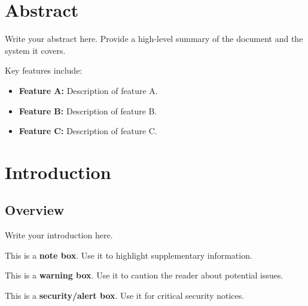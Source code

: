 \documentclass[11pt,a4paper]{article}
\begin{document}
\newpage
\tableofcontents
\newpage

\section*{Abstract}

Write your abstract here. Provide a high-level summary of the document and the system it covers.

Key features include:
\begin{itemize}[noitemsep]
    \item \textbf{Feature A:} Description of feature A.
    \item \textbf{Feature B:} Description of feature B.
    \item \textbf{Feature C:} Description of feature C.
\end{itemize}

\newpage

\section{Introduction}

\subsection{Overview}
Write your introduction here.

\begin{notebox}
    This is a \textbf{note box}. Use it to highlight supplementary information.
\end{notebox}

\begin{warnbox}
    This is a \textbf{warning box}. Use it to caution the reader about potential issues.
\end{warnbox}

\begin{alertbox}
    This is a \textbf{security/alert box}. Use it for critical security notices.
\end{alertbox}
\end{document}
